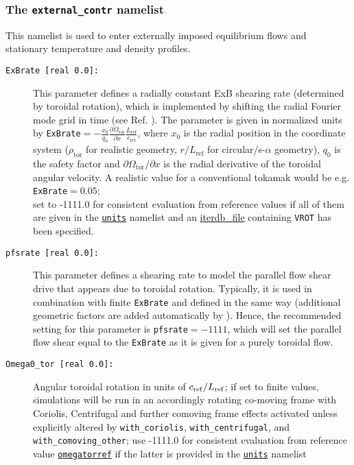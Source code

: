 \documentclass[12pt]{article}
\begin{document}
\subsubsection{The \texttt{external\_contr} namelist}
This namelist is used to enter externally imposed equilibrium flows and stationary temperature and density
profiles.
\begin{description}
\item[\texttt{ExBrate [real 0.0]:}] This parameter defines a radially constant ExB shearing rate
  (determined by toroidal rotation), which is implemented by shifting the radial Fourier mode grid in time
  (see Ref. \cite{Hammett06}). The parameter is given in normalized units by
  \texttt{ExBrate}$=-\frac{x_0}{q_0}\frac{\partial\Omega_{\mathrm{tor}}}{\partial x}\frac{L_\mathrm{ref}}{c_\mathrm{ref}}$,
  where $x_0$ is the radial position in the \gene coordinate system ($\rho_\mathrm{tor}$ for realistic geometry,
  $r/L_\mathrm{ref}$ for
  circular/s-$\alpha$ geometry), $q_0$ is the safety factor and $\partial\Omega_{\mathrm{tor}}/\partial x$
  is the radial derivative of the
  toroidal angular velocity. A realistic value for a conventional tokamak would be e.g. \texttt{ExBrate}$=0.05$;\\
  set to -1111.0 for consistent evaluation from reference values if all of them are given
  in the \hyperlink{units_nml}{\tt units} namelist and an \hyperlink{iterdb_file}{iterdb\_file} containing \texttt{VROT}
  has been specified.
\item[\texttt{pfsrate [real 0.0]:}] This parameter defines a shearing rate to model the parallel flow shear
  drive that appears due to toroidal rotation. Typically, it is used in combination with finite \texttt{ExBrate} and
  defined in the same way (additional geometric factors are added automatically by \gene).
  Hence, the recommended setting for this parameter is \texttt{pfsrate}$=-1111$, which will set the parallel flow shear
  equal to the \texttt{ExBrate} as it is given for a purely toroidal flow.
\item[\texttt{Omega0\_tor [real 0.0]:}] Angular toroidal rotation in units of $c_{\rm ref}/L_{\rm ref}$; if set to finite values,
simulations will be run in an accordingly rotating co-moving frame with Coriolis, Centrifugal and further comoving
frame effects activated unless explicitly altered by {\tt with\_coriolis}, {\tt with\_centrifugal}, and {\tt with\_comoving\_other};
use -1111.0 for consistent evaluation from reference value \hyperlink{omegatorref}{\tt omegatorref} if the latter is provided in the \hyperlink{units_nml}{\tt units} namelist

\end{description}
\end{document}
